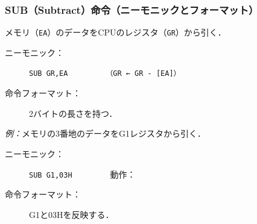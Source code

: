 \documentclass{beamer}                 %
\begin{document}
\begin{frame}
  \frametitle{SUB（Subtract）命令（ニーモニックとフォーマット）}
  メモリ（\texttt{EA}）のデータをCPUのレジスタ（\texttt{GR}）から引く．

  \begin{description}
  \item[ニーモニック：]\texttt{SUB GR,EA}~~~~~~~~~\texttt{（GR ← GR - [EA]）}
    \vfill

  \item[命令フォーマット：] 2バイトの長さを持つ．\\
  \end{description}
  \vfill

  \emph{例：}メモリの3番地のデータをG1レジスタから引く．
  \begin{description}
  \item[ニーモニック：]\texttt{SUB G1,03H}~~~~~~~~~動作：

  \item[命令フォーマット：] G1と03Hを反映する．\\
  \end{description}
  \vfill
\end{frame}
\end{document}

